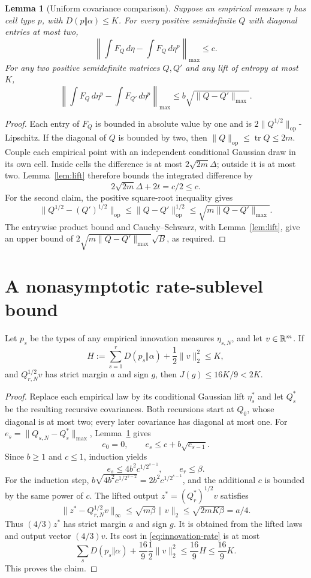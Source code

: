 \documentclass[11pt]{article}
\newtheorem{lemma}[theorem]{Lemma}\newtheorem{corollary}[theorem]{Corollary}
\theoremstyle{remark}\newtheorem{remark}[theorem]{Remark}
\begin{document}
\begin{lemma}[Uniform covariance comparison]\label{lem:quantization}
Suppose an empirical measure $\eta$ has cell type $p$, with
$D(p\Vert\alpha)\leq K$. For every positive semidefinite $Q$ with diagonal
entries at most two,
\[
 \left\|\int F_Q\,d\eta-\int F_Q\,d\eta^p\right\|_{\max}\leq c.
\]
For any two positive semidefinite matrices $Q,Q'$ and any lift of entropy
at most $K$,
\[
 \left\|\int F_Q\,d\eta^p-\int F_{Q'}\,d\eta^p\right\|_{\max}
 \leq b\sqrt{\|Q-Q'\|_{\max}}.
\]
\end{lemma}
\begin{proof}
Each entry of $F_Q$ is bounded in absolute value by one and is
$2\|Q^{1/2}\|_{\mathrm{op}}$-Lipschitz. If the diagonal of $Q$ is bounded
by two, then $\|Q\|_{\mathrm{op}}\leq\operatorname{tr}Q\leq2m$.
Couple each empirical point with an independent conditional Gaussian draw
in its own cell. Inside cells the difference is at most
$2\sqrt{2m}\Delta$; outside it is at most two. Lemma~\ref{lem:lift}
therefore bounds the integrated difference by
\[
 2\sqrt{2m}\Delta+2t=c/2\leq c.
\]
For the second claim, the positive square-root inequality gives
\[
 \|Q^{1/2}-(Q')^{1/2}\|_{\mathrm{op}}
 \leq\|Q-Q'\|_{\mathrm{op}}^{1/2}
 \leq\sqrt{m\|Q-Q'\|_{\max}}.
\]
The entrywise product bound and Cauchy--Schwarz, with
Lemma~\ref{lem:lift}, give an upper bound of
$2\sqrt{m\|Q-Q'\|_{\max}}\sqrt B$, as required.
\end{proof}

\section{A nonasymptotic rate-sublevel bound}
\begin{proposition}
\label{prop:deterministic}
Let $p_s$ be the types of any empirical innovation measures
$\eta_{s,N}$, and let $v\in\mathbb R^m$. If
\[
 H:=\sum_{s=1}^rD(p_s\Vert\alpha)+\frac12\|v\|_2^2\leq K,
\]
and $Q_{r,N}^{1/2}v$ has strict margin $a$ and sign $g$, then
$J(g)\leq16K/9<2K$.
\end{proposition}
\begin{proof}
Replace each empirical law by its conditional Gaussian lift $\eta_s^*$
and let $Q_s^*$ be the resulting recursive covariances.
Both recursions start at $Q_0$, whose diagonal is at most two; every later
covariance has diagonal at most one. For
$e_s=\|Q_{s,N}-Q_s^*\|_{\max}$, Lemma~\ref{lem:quantization} gives
\[
 e_0=0,\qquad e_s\leq c+b\sqrt{e_{s-1}}.
\]
Since $b\geq1$ and $c\leq1$, induction yields
\[
 e_s\leq4b^2c^{1/2^{s-1}},\qquad e_r\leq\beta.
\]
For the induction step, $b\sqrt{4b^2c^{1/2^{s-2}}}
=2b^2c^{1/2^{s-1}}$, and the additional $c$ is bounded by the same
power of $c$.
The lifted output $z^*=(Q_r^*)^{1/2}v$ satisfies
\[
 \|z^*-Q_{r,N}^{1/2}v\|_\infty
 \leq\sqrt{m\beta}\|v\|_2
 \leq\sqrt{2mK\beta}=a/4.
\]
Thus $(4/3)z^*$ has strict margin $a$ and sign $g$.
It is obtained from the lifted laws and output vector $(4/3)v$.
Its cost in \eqref{eq:innovation-rate} is at most
\[
 \sum_sD(p_s\Vert\alpha)+\frac{16}{9}\frac12\|v\|_2^2
 \leq\frac{16}{9}H\leq\frac{16}{9}K.
\]
This proves the claim.
\end{proof}
\end{document}
